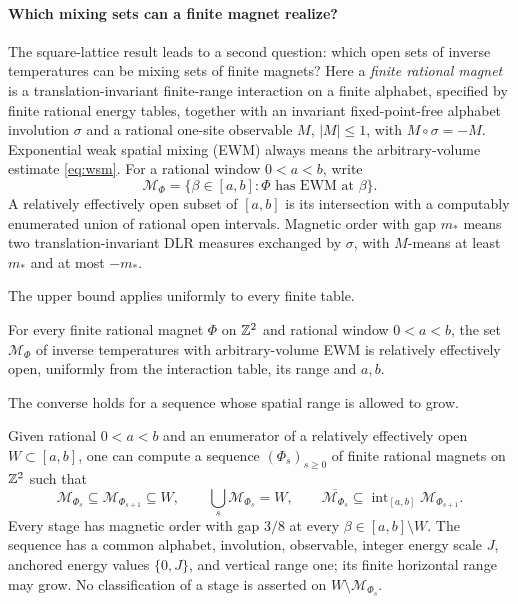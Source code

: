 \paragraph{Which mixing sets can a finite magnet realize?}
The square-lattice result leads to a second question: which open sets of inverse temperatures can be mixing sets of finite magnets? Here a \emph{finite rational magnet} is a translation-invariant finite-range interaction on a finite alphabet, specified by finite rational energy tables, together with an invariant fixed-point-free alphabet involution \(\sigma\) and a rational one-site observable \(M\), \(|M|\le1\), with \(M\circ\sigma=-M\). Exponential weak spatial mixing (EWM) always means the arbitrary-volume estimate \eqref{eq:wsm}. For a rational window \(0<a<b\), write
\[
\mathcal M_\Phi=\{\beta\in[a,b]:\Phi\text{ has EWM at }\beta\}.
\]
A relatively effectively open subset of \([a,b]\) is its intersection with a computably enumerated union of rational open intervals. Magnetic order with gap \(m_*\) means two translation-invariant DLR measures exchanged by \(\sigma\), with \(M\)-means at least \(m_*\) and at most \(-m_*\).

The upper bound applies uniformly to every finite table.
\begin{theoremD}\label{thm:D}
For every finite rational magnet \(\Phi\) on \(\mathbb Z^2\) and rational window \(0<a<b\), the set \(\mathcal M_\Phi\) of inverse temperatures with arbitrary-volume EWM is relatively effectively open, uniformly from the interaction table, its range and \(a,b\).
\end{theoremD}

The converse holds for a sequence whose spatial range is allowed to grow.
\begin{theoremE}\label{thm:E}
Given rational \(0<a<b\) and an enumerator of a relatively effectively open \(W\subset[a,b]\), one can compute a sequence \((\Phi_s)_{s\ge0}\) of finite rational magnets on \(\mathbb Z^2\) such that
\[
\mathcal M_{\Phi_s}\subseteq\mathcal M_{\Phi_{s+1}}\subseteq W,
\qquad \bigcup_s\mathcal M_{\Phi_s}=W,
\qquad
\overline{\mathcal M_{\Phi_s}}\subseteq
\operatorname{int}_{[a,b]}\mathcal M_{\Phi_{s+1}}.
\]
Every stage has magnetic order with gap \(3/8\) at every \(\beta\in[a,b]\setminus W\). The sequence has a common alphabet, involution, observable, integer energy scale \(J\), anchored energy values \(\{0,J\}\), and vertical range one; its finite horizontal range may grow. No classification of a stage is asserted on \(W\setminus\mathcal M_{\Phi_s}\).
\end{theoremE}

